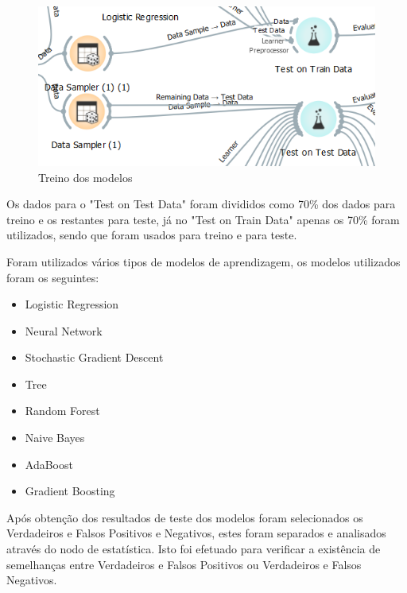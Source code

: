 \begin{figure}[H]
    \centering
    \includegraphics[scale=0.8]{images/Testetraintest.png}
     \caption{Treino dos modelos}
\end{figure}

Os dados para o "Test on Test Data" foram divididos como 70\% dos dados para treino e os restantes para teste, já no "Test on Train Data" apenas os 70\% foram utilizados, sendo que foram usados para treino e para teste.

Foram utilizados vários tipos de modelos de aprendizagem, os modelos utilizados foram os seguintes:

\begin{itemize}
    \item Logistic Regression
    \item Neural Network
    \item Stochastic Gradient Descent
    \item Tree
    \item Random Forest
    \item Naive Bayes
    \item AdaBoost
    \item Gradient Boosting
\end{itemize}


Após obtenção dos resultados de teste dos modelos foram selecionados os Verdadeiros e Falsos Positivos e Negativos, estes foram separados e analisados através do nodo de estatística. Isto foi efetuado para verificar a existência de semelhanças entre Verdadeiros e Falsos Positivos ou Verdadeiros e Falsos Negativos.


